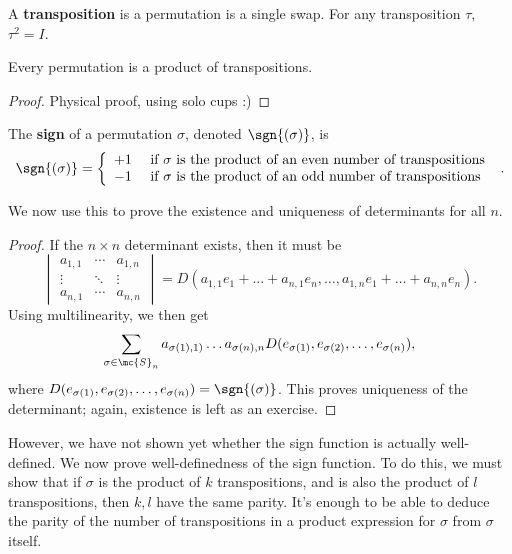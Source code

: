 \documentclass[math0540-lecture-notes.tex]{subfiles}
\begin{document}
\begin{definition}[Transpositions]{}
  A \textbf{transposition} is a permutation is a single swap. For any transposition $\tau$,
  $\tau^2=I$.
\end{definition}

\begin{proposition}[]{}
  Every permutation is a product of transpositions. 
\end{proposition}
\begin{proof}[Proof]
  Physical proof, using solo cups :)
\end{proof}

\begin{definition}[Sign]{}
  The \textbf{sign} of a permutation $\sigma$, denoted $\sgn{(\sigma)}$, is \[
    \sgn{(\sigma)}=\left\{ \begin{array}{rl} +1 & ~\text{if $\sigma$ is the product of an even
        number of transpositions}~\\
      -1 & ~\text{if $\sigma$ is the product of an odd number of transpositions}~\end{array}\right.
  .\] 
\end{definition}

We now use this to prove the existence and uniqueness of determinants for all $n$.
\begin{proof}[Proof]
  If the $n\times n$ determinant exists, then it must be \[
    \begin{vmatrix} a_{1,1}&\cdots&a_{1,n}\\ \vdots & \ddots &\vdots\\ a_{n,1}&\cdots&a_{n,n}
    \end{vmatrix}
    =D(a_{1,1}e_1+\ldots+a_{n,1}e_n,\ldots,a_{1,n}e_1+\ldots+a_{n,n}e_n)
  .\] Using multilinearity, we then get \[
\sum_{\sigma\in \mc{S}_n}
    a_{\sigma(1),1)}\ldots a_{\sigma(n),n}D(e_{\sigma(1)},e_{\sigma(2)},\ldots,e_{\sigma(n)})
  ,\] where $D(e_{\sigma(1)},e_{\sigma(2)},\ldots,e_{\sigma(n)})=\sgn{(\sigma)}$. This proves
  uniqueness of the determinant; again, existence is left as an exercise.
\end{proof}

However, we have not shown yet whether the sign function is actually well-defined. We now prove
well-definedness of the sign function. To do this, we must show that if $\sigma$ is the product of
$k$ transpositions, and is also the product of $l$ transpositions, then $k,l$ have the same parity.
It's enough to be able to deduce the parity of the number of transpositions in a product expression
for $\sigma$ from $\sigma$ itself.
\end{document}
